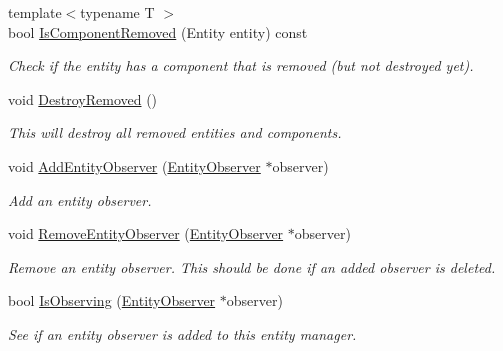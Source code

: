 \begin{DoxyCompactItemize}
{\footnotesize template$<$typename T $>$ }\\bool \hyperlink{class_e_c_s_1_1_entity_manager_a97a29fef50eb575545e5bcf0be5c5231}{Is\-Component\-Removed} (Entity entity) const 
\begin{DoxyCompactList}\small\item\em Check if the entity has a component that is removed (but not destroyed yet). \end{DoxyCompactList}\item 
void \hyperlink{class_e_c_s_1_1_entity_manager_a202e0fb0a88c6eb742efbdb77e38a07a}{Destroy\-Removed} ()
\begin{DoxyCompactList}\small\item\em This will destroy all removed entities and components. \end{DoxyCompactList}\item 
\hypertarget{class_e_c_s_1_1_entity_manager_a4e3af21bc0c93a38787e3bbd165684b2}{void \hyperlink{class_e_c_s_1_1_entity_manager_a4e3af21bc0c93a38787e3bbd165684b2}{Add\-Entity\-Observer} (\hyperlink{class_e_c_s_1_1_entity_observer}{Entity\-Observer} $\ast$observer)}\label{class_e_c_s_1_1_entity_manager_a4e3af21bc0c93a38787e3bbd165684b2}

\begin{DoxyCompactList}\small\item\em Add an entity observer. \end{DoxyCompactList}\item 
\hypertarget{class_e_c_s_1_1_entity_manager_a03c47ba6943d80e5b95341036273215f}{void \hyperlink{class_e_c_s_1_1_entity_manager_a03c47ba6943d80e5b95341036273215f}{Remove\-Entity\-Observer} (\hyperlink{class_e_c_s_1_1_entity_observer}{Entity\-Observer} $\ast$observer)}\label{class_e_c_s_1_1_entity_manager_a03c47ba6943d80e5b95341036273215f}

\begin{DoxyCompactList}\small\item\em Remove an entity observer. This should be done if an added observer is deleted. \end{DoxyCompactList}\item 
\hypertarget{class_e_c_s_1_1_entity_manager_a47ac42609da24397e38a736a790b8b81}{bool \hyperlink{class_e_c_s_1_1_entity_manager_a47ac42609da24397e38a736a790b8b81}{Is\-Observing} (\hyperlink{class_e_c_s_1_1_entity_observer}{Entity\-Observer} $\ast$observer)}\label{class_e_c_s_1_1_entity_manager_a47ac42609da24397e38a736a790b8b81}

\begin{DoxyCompactList}\small\item\em See if an entity observer is added to this entity manager. \end{DoxyCompactList}\end{DoxyCompactItemize}


